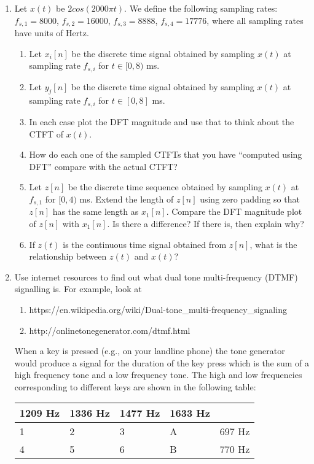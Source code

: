 \begin{enumerate}
\item Let $x(t)$ be $2cos(2000\pi t)$. We define the following sampling rates: $f_{s,1} = 8000$, $f_{s,2} = 16000$, $f_{s,3} = 8888$, $f_{s,4} = 17776$, where all sampling rates have units of Hertz.
  \begin{enumerate}
  \item Let $x_{i}[n]$ be the discrete time signal obtained by sampling $x(t)$ at sampling rate $f_{s,i}$ for $t \in [0, 8)$ ms. 
  \item Let $y_{j}[n]$ be the discrete time signal obtained by sampling $x(t)$ at sampling rate $f_{s,i}$ for $t \in [0, 8]$ ms. 
  \item In each case plot the DFT magnitude and use that to think about the CTFT of $x(t)$.
  \item How do each one of the sampled CTFTs that you have ``computed using DFT'' compare with the actual CTFT? 
  \item Let $z[n]$ be the discrete time sequence obtained by sampling $x(t)$ at $f_{s,1}$ for $[0, 4)$ ms. Extend the length of $z[n]$ using zero padding so that $z[n]$ has the same length as $x_{1}[n]$. Compare the DFT magnitude plot of $z[n]$ with $x_{1}[n]$. Is there a difference? If there is, then explain why? 
  \item If $z(t)$ is the continuous time signal obtained from $z[n]$, what is the relationship between $z(t)$ and $x(t)$?
  \end{enumerate}
\item Use internet resources to find out what dual tone multi-frequency (DTMF) signalling is. For example, look at
  \begin{enumerate}
  \item https://en.wikipedia.org/wiki/Dual-tone\_multi-frequency\_signaling
  \item http://onlinetonegenerator.com/dtmf.html
  \end{enumerate}
  When a key is pressed (e.g., on your landline phone) the tone generator would produce a signal for the duration of the key press which is the sum of a high frequency tone and a low frequency tone.
  The high and low frequencies corresponding to different keys are shown in the following table:
  \begin{center}
    \begin{tabular}{|l|l|l|l|l|}
      1209 Hz & 1336 Hz & 1477 Hz & 1633 Hz & \\
      \hline
      1 & 2 & 3 & A & 697 Hz \\
      4 & 5 & 6 & B & 770 Hz \\

\end{tabular}
\end{center}
\end{enumerate}
